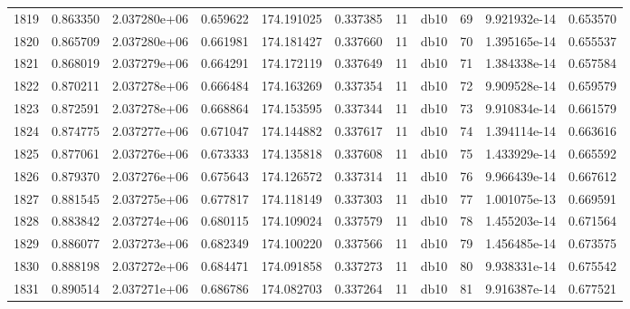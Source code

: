 \begin{tabular}{lrrrrrrlrrr}
1819 &    0.863350 &        2.037280e+06 &  0.659622 &              174.191025 &    0.337385 &      11 &         db10 &     69 &   9.921932e-14 &      0.653570 \\
1820 &    0.865709 &        2.037280e+06 &  0.661981 &              174.181427 &    0.337660 &      11 &         db10 &     70 &   1.395165e-14 &      0.655537 \\
1821 &    0.868019 &        2.037279e+06 &  0.664291 &              174.172119 &    0.337649 &      11 &         db10 &     71 &   1.384338e-14 &      0.657584 \\
1822 &    0.870211 &        2.037278e+06 &  0.666484 &              174.163269 &    0.337354 &      11 &         db10 &     72 &   9.909528e-14 &      0.659579 \\
1823 &    0.872591 &        2.037278e+06 &  0.668864 &              174.153595 &    0.337344 &      11 &         db10 &     73 &   9.910834e-14 &      0.661579 \\
1824 &    0.874775 &        2.037277e+06 &  0.671047 &              174.144882 &    0.337617 &      11 &         db10 &     74 &   1.394114e-14 &      0.663616 \\
1825 &    0.877061 &        2.037276e+06 &  0.673333 &              174.135818 &    0.337608 &      11 &         db10 &     75 &   1.433929e-14 &      0.665592 \\
1826 &    0.879370 &        2.037276e+06 &  0.675643 &              174.126572 &    0.337314 &      11 &         db10 &     76 &   9.966439e-14 &      0.667612 \\
1827 &    0.881545 &        2.037275e+06 &  0.677817 &              174.118149 &    0.337303 &      11 &         db10 &     77 &   1.001075e-13 &      0.669591 \\
1828 &    0.883842 &        2.037274e+06 &  0.680115 &              174.109024 &    0.337579 &      11 &         db10 &     78 &   1.455203e-14 &      0.671564 \\
1829 &    0.886077 &        2.037273e+06 &  0.682349 &              174.100220 &    0.337566 &      11 &         db10 &     79 &   1.456485e-14 &      0.673575 \\
1830 &    0.888198 &        2.037272e+06 &  0.684471 &              174.091858 &    0.337273 &      11 &         db10 &     80 &   9.938331e-14 &      0.675542 \\
1831 &    0.890514 &        2.037271e+06 &  0.686786 &              174.082703 &    0.337264 &      11 &         db10 &     81 &   9.916387e-14 &      0.677521 \\

\end{tabular}

